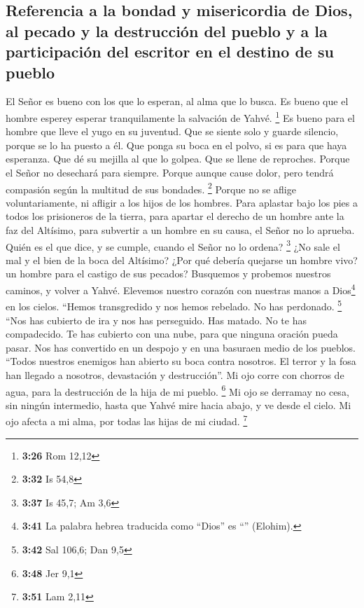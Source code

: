 \begin{paracol}{2}
\hypertarget{referencia-a-la-bondad-y-misericordia-de-dios-al-pecado-y-la-destrucciuxf3n-del-pueblo-y-a-la-participaciuxf3n-del-escritor-en-el-destino-de-su-pueblo}{%
\subsection{Referencia a la bondad y misericordia de Dios, al pecado y
la destrucción del pueblo y a la participación del escritor en el
destino de su
pueblo}\label{referencia-a-la-bondad-y-misericordia-de-dios-al-pecado-y-la-destrucciuxf3n-del-pueblo-y-a-la-participaciuxf3n-del-escritor-en-el-destino-de-su-pueblo}}

 El Señor es bueno con los que lo esperan, al alma que lo
busca.  Es bueno que el hombre esperey esperar
tranquilamente la salvación de Yahvé. \footnote{\textbf{3:26} Rom 12,12}
 Es bueno para el hombre que lleve el yugo en su
juventud.  Que se siente solo y guarde silencio, porque
se lo ha puesto a él.  Que ponga su boca en el polvo, si
es para que haya esperanza.  Que dé su mejilla al que lo
golpea. Que se llene de reproches.  Porque el Señor no
desechará para siempre.  Porque aunque cause dolor, pero
tendrá compasión según la multitud de sus bondades. \footnote{\textbf{3:32}
  Is 54,8}  Porque no se aflige voluntariamente, ni
afligir a los hijos de los hombres.  Para aplastar bajo
los pies a todos los prisioneros de la tierra,  para
apartar el derecho de un hombre ante la faz del Altísimo,
 para subvertir a un hombre en su causa, el Señor no lo
aprueba.  Quién es el que dice, y se cumple, cuando el
Señor no lo ordena? \footnote{\textbf{3:37} Is 45,7; Am 3,6}
 ¿No sale el mal y el bien de la boca del Altísimo?
 ¿Por qué debería quejarse un hombre vivo? un hombre para
el castigo de sus pecados?  Busquemos y probemos nuestros
caminos, y volver a Yahvé.  Elevemos nuestro corazón con
nuestras manos a Dios\footnote{\textbf{3:41} La palabra hebrea traducida
  como ``Dios'' es ``'' (Elohim).} en los cielos.
 ``Hemos transgredido y nos hemos rebelado. No has
perdonado. \footnote{\textbf{3:42} Sal 106,6; Dan 9,5} 
``Nos has cubierto de ira y nos has perseguido. Has matado. No te has
compadecido.  Te has cubierto con una nube, para que
ninguna oración pueda pasar.  Nos has convertido en un
despojo y en una basuraen medio de los pueblos.  ``Todos
nuestros enemigos han abierto su boca contra nosotros. 
El terror y la fosa han llegado a nosotros, devastación y destrucción''.
 Mi ojo corre con chorros de agua, para la destrucción de
la hija de mi pueblo. \footnote{\textbf{3:48} Jer 9,1} 
Mi ojo se derramay no cesa, sin ningún intermedio,  hasta
que Yahvé mire hacia abajo, y ve desde el cielo.  Mi ojo
afecta a mi alma, por todas las hijas de mi ciudad. \footnote{\textbf{3:51}
  Lam 2,11}


\end{paracol}
